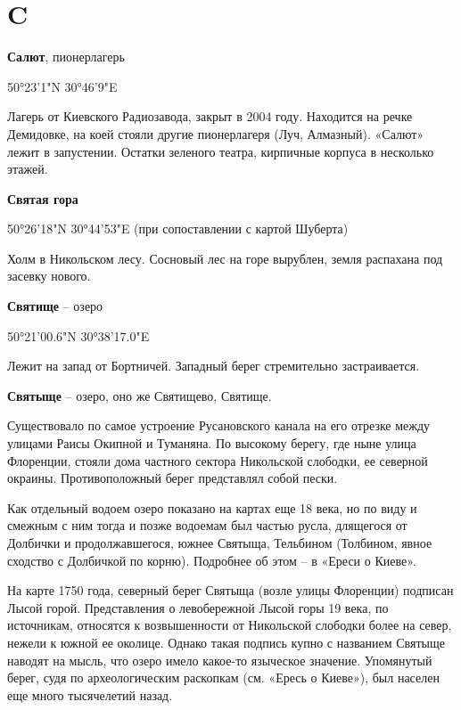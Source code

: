 \chapter*{C}

\textbf{Салют}, пионерлагерь

50°23'1"N 30°46'9"E

Лагерь от Киевского Радиозавода, закрыт в 2004 году. Находится на речке Демидовке, на коей стояли другие пионерлагеря (Луч, Алмазный). «Салют» лежит в запустении. Остатки зеленого театра, кирпичные корпуса в несколько этажей.\\

\medskip


\textbf{Святая гора}

50°26'18"N 30°44'53"E (при сопоставлении с картой Шуберта)

Холм в Никольском лесу. Сосновый лес на горе вырублен, земля распахана под засевку нового.\\

\medskip


\textbf{Святище} – озеро 

50°21'00.6"N 30°38'17.0"E

Лежит на запад от Бортничей. Западный берег стремительно застраивается.\\

\medskip


\textbf{Святыще} – озеро, оно же Святищево, Святище. 

Существовало по самое устроение Русановского канала на его отрезке между улицами Раисы Окипной и Туманяна. По высокому берегу, где ныне улица Флоренции, стояли дома частного сектора Никольской слободки, ее северной окраины. Противоположный берег представлял собой пески.

Как отдельный водоем озеро показано на картах еще 18 века, но по виду и смежным с ним тогда и позже водоемам был частью русла, длящегося от Долбички и продолжавшегося, южнее Святыща, Тельбином (Толбином, явное сходство с Долбичкой по корню). Подробнее об этом – в «Ереси о Киеве».

На карте 1750 года, северный берег Святыща (возле улицы Флоренции) подписан Лысой горой. Представления о левобережной Лысой горы 19 века, по источникам, относятся к возвышенности от Никольской слободки более на север, нежели к южной ее околице. Однако такая подпись купно с названием Святыще наводят на мысль, что озеро имело какое-то языческое значение. Упомянутый берег, судя по археологическим раскопкам (см. «Ересь о Киеве»), был населен еще много тысячелетий назад.

